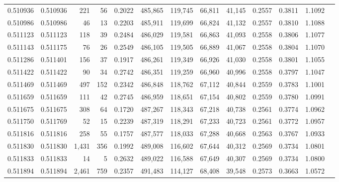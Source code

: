 \begin{tabular}{rrrrrrrrrrrrr}
0.510936 & 0.510936 &   221 &    56 &                                     0.2022 & 485,865 & 119,745 &  66,811 &  41,145 & 0.2557 & 0.3811 & 1.1092 \\
0.510986 & 0.510986 &    46 &    13 &                                     0.2203 & 485,911 & 119,699 &  66,824 &  41,132 & 0.2557 & 0.3810 & 1.1088 \\
0.511123 & 0.511123 &   118 &    39 &                                     0.2484 & 486,029 & 119,581 &  66,863 &  41,093 & 0.2558 & 0.3806 & 1.1077 \\
0.511143 & 0.511175 &    76 &    26 &                                     0.2549 & 486,105 & 119,505 &  66,889 &  41,067 & 0.2558 & 0.3804 & 1.1070 \\
0.511286 & 0.511401 &   156 &    37 &                                     0.1917 & 486,261 & 119,349 &  66,926 &  41,030 & 0.2558 & 0.3801 & 1.1055 \\
0.511422 & 0.511422 &    90 &    34 &                                     0.2742 & 486,351 & 119,259 &  66,960 &  40,996 & 0.2558 & 0.3797 & 1.1047 \\
0.511469 & 0.511469 &   497 &   152 &                                     0.2342 & 486,848 & 118,762 &  67,112 &  40,844 & 0.2559 & 0.3783 & 1.1001 \\
0.511659 & 0.511659 &   111 &    42 &                                     0.2745 & 486,959 & 118,651 &  67,154 &  40,802 & 0.2559 & 0.3780 & 1.0991 \\
0.511675 & 0.511675 &   308 &    64 &                                     0.1720 & 487,267 & 118,343 &  67,218 &  40,738 & 0.2561 & 0.3774 & 1.0962 \\
0.511750 & 0.511769 &    52 &    15 &                                     0.2239 & 487,319 & 118,291 &  67,233 &  40,723 & 0.2561 & 0.3772 & 1.0957 \\
0.511816 & 0.511816 &   258 &    55 &                                     0.1757 & 487,577 & 118,033 &  67,288 &  40,668 & 0.2563 & 0.3767 & 1.0933 \\
0.511830 & 0.511830 & 1,431 &   356 &                                     0.1992 & 489,008 & 116,602 &  67,644 &  40,312 & 0.2569 & 0.3734 & 1.0801 \\
0.511833 & 0.511833 &    14 &     5 &                                     0.2632 & 489,022 & 116,588 &  67,649 &  40,307 & 0.2569 & 0.3734 & 1.0800 \\
0.511894 & 0.511894 & 2,461 &   759 &                                     0.2357 & 491,483 & 114,127 &  68,408 &  39,548 & 0.2573 & 0.3663 & 1.0572 \\

\end{tabular}
